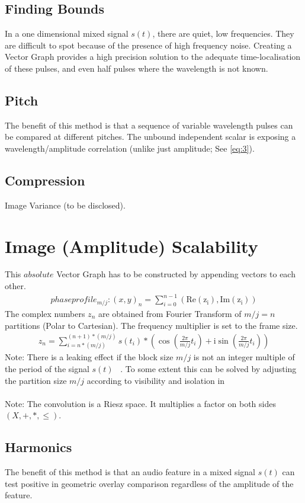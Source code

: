 \documentclass{report}
\begin{document}
\subsection{Finding Bounds}
In a one dimensional mixed signal $s(t)$, there are quiet, low frequencies. They are difficult to spot because of the presence of high frequency noise. Creating a Vector Graph provides a high precision solution to the adequate time-localisation of these pulses, and even half pulses where the wavelength is not known.
\subsection{Pitch}
The benefit of this method is that a sequence of variable wavelength pulses can be compared at different pitches. The unbound independent scalar is exposing a wavelength/amplitude correlation (unlike just amplitude; See \eqref{eq:3}).
\subsection{Compression}
Image Variance (to be disclosed).
\section{Image (Amplitude) Scalability}
This $absolute$ Vector Graph has to be constructed by appending vectors to each other.
\begin{align}
phaseprofile_{m/j}: (x,y)_{n}=\sum \limits _{i=0}^{n-1}(\mathrm{Re(z_{i})},\mathrm{Im(z_{i})})
\end{align}
The complex numbers $z_{n}$ are obtained from Fourier Transform of $m/j=n$ partitions (Polar to Cartesian). The frequency multiplier is set to the frame size.
\begin{align}
z_{n}= \sum \limits _{i=n*(m/j)}^{(n+1)*(m/j)} s(t_{i})*(\cos(\frac{2\pi}{m/j}t_{i})+\mathrm{i}\sin(\frac{2\pi}{m/j}t_{i}))\label{eq:3}
\end{align}
Note: There is a leaking effect if the block size $m/j$ is not an integer multiple of the period of the signal $s(t)$ ~\cite[Fensterfunktion]{Fensterfunktion}. To some extent this can be solved by adjusting the partition size $m/j$ according to visibility and isolation in ~\cite[Stopeight\_Comparator.tex]{Comparator}\\\\
Note: The convolution is a Riesz space. It multiplies a factor on both sides $(X,+,*,\leq)$.
\subsection{Harmonics}
The benefit of this method is that an audio feature in a mixed signal $s(t)$ can test positive in geometric overlay comparison regardless of the amplitude of the feature.

\iffalse
\printbibliography
\fi
{}

\end{document}
